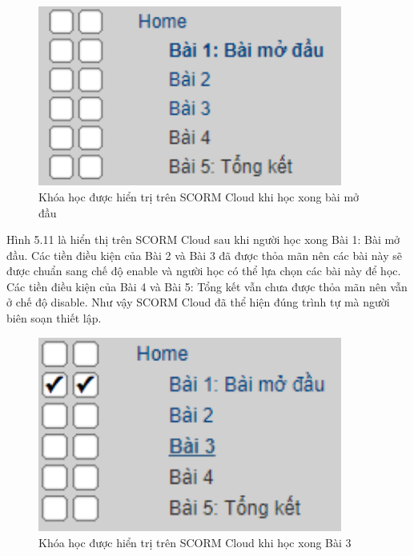 \newpage

\begin{center}
	\begin{figure}[htp]
		\begin{center}
			\includegraphics[width=10cm]{Chapter5/Pictures/picture511.png}
		\end{center}
		\caption{Khóa học được hiển trị trên SCORM Cloud khi học xong bài mở đầu}
		\label{refhinhchuong66}
	\end{figure}
\end{center}

Hình 5.11 là hiển thị trên SCORM Cloud sau khi người học xong Bài 1: Bài mở đầu. Các tiền điều kiện của Bài 2 và Bài 3 đã được thỏa mãn nên các bài này sẽ được chuẩn sang chế độ enable và người học có thể lựa chọn các bài này để học. Các tiền điều kiện của Bài 4 và Bài 5: Tổng kết vẫn chưa được thỏa mãn nên vẫn ở chế độ disable. Như vậy SCORM Cloud đã thể hiện đúng trình tự mà người biên soạn thiết lập.

\begin{center}
	\begin{figure}[htp]
		\begin{center}
			\includegraphics[width=10cm]{Chapter5/Pictures/picture512.png}
		\end{center}
		\caption{Khóa học được hiển trị trên SCORM Cloud khi học xong Bài 3}
		\label{refhinhchuong66}
	\end{figure}
\end{center}

